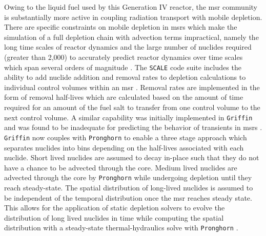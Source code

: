 Owing to the liquid fuel used by this Generation IV reactor, the \acrshort{msr} community is substantially more active in coupling radiation transport with mobile depletion. There are specific constraints on mobile depletion in \acrshort{msr}s which make the simulation of a full depletion chain with advection terms impractical, namely the long time scales of reactor dynamics and the large number of nuclides required (greater than 2,000) to accurately predict reactor dynamics over time scales which span several orders of magnitude \cite{griffin_pronghorn_msr}. The \texttt{SCALE} code suite includes the ability to add nuclide addition and removal rates to depletion calculations to individual control volumes within an \acrshort{msr} \cite{scale_msr}. Removal rates are implemented in the form of removal half-lives which are calculated based on the amount of time required for an amount of the fuel salt to transfer from one control volume to the next control volume. A similar capability was initially implemented in \texttt{Griffin} \cite{griffin_pronghorn_msr_init} and was found to be inadequate for predicting the behavior of transients in \acrshort{msr}s \cite{griffin_pronghorn_msr}. \texttt{Griffin} now couples with \texttt{Pronghorn} to enable a three stage approach which separates nuclides into bins depending on the half-lives associated with each nuclide. Short lived nuclides are assumed to decay in-place such that they do not have a chance to be advected through the core. Medium lived nuclides are advected through the core by \texttt{Pronghorn} while undergoing depletion until they reach steady-state. The spatial distribution of long-lived nuclides is assumed to be independent of the temporal distribution once the \acrshort{msr} reaches steady state. This allows for the application of static depletion solvers to evolve the distribution of long lived nuclides in time while computing the spatial distribution with a steady-state thermal-hydraulics solve with \texttt{Pronghorn} \cite{griffin_pronghorn_msr}.

